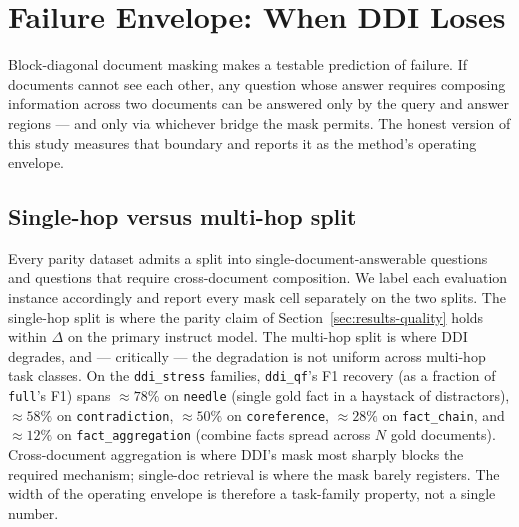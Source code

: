 \section{Failure Envelope: When DDI Loses}
\label{sec:failure-envelope}

Block-diagonal document masking makes a testable prediction of failure.
If documents cannot see each other, any question whose answer requires
composing information across two documents can be answered only by the
query and answer regions --- and only via whichever bridge the mask
permits. The honest version of this study measures that boundary and
reports it as the method's operating envelope.

\subsection{Single-hop versus multi-hop split}
\label{sec:failure-envelope-hop}

Every parity dataset admits a split into single-document-answerable
questions and questions that require cross-document composition. We
label each evaluation instance accordingly and report every mask cell
separately on the two splits. The single-hop split is where the parity
claim of Section~\ref{sec:results-quality} holds within $\Delta$ on
the primary instruct model. The multi-hop split is where DDI degrades,
and --- critically --- the degradation is not uniform across multi-hop
task classes. On the \texttt{ddi\_stress} families, \texttt{ddi\_qf}'s
F1 recovery (as a fraction of \texttt{full}'s F1) spans
$\approx 78\%$ on \texttt{needle} (single gold fact in a haystack of
distractors), $\approx 58\%$ on \texttt{contradiction},
$\approx 50\%$ on \texttt{coreference}, $\approx 28\%$ on
\texttt{fact\_chain}, and $\approx 12\%$ on \texttt{fact\_aggregation}
(combine facts spread across $N$ gold documents). Cross-document
aggregation is where DDI's mask most sharply blocks the required
mechanism; single-doc retrieval is where the mask barely registers.
The width of the operating envelope is therefore a task-family property,
not a single number. 

